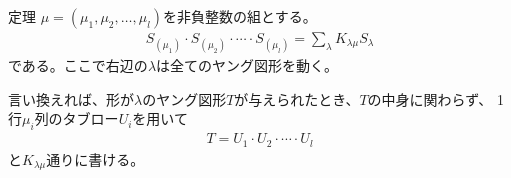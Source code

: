 \documentclass[a4paper,11pt]{jsarticle}
\theoremstyle{plain}
\theoremstyle{definition}
\renewcommand{\(}{\left(}
\renewcommand{\)}{\right)}
\renewcommand{\[}{\left[}
\renewcommand{\]}{\right]}
\renewcommand{\{}{\left\lbrace}
\renewcommand{\}}{\right\rbrace}
\begin{document}
\begin{itembox}[l]{定理}
    $\mu = (\mu_1, \mu_2, \ldots, \mu_l)$を非負整数の組とする。
    \begin{align*}
        S_{(\mu_1)} \cdot S_{(\mu_2)} \cdot\cdots \cdot S_{(\mu_l)} = \sum_{\lambda} K_{\lambda \mu} S_{\lambda}
    \end{align*}
    である。ここで右辺の$\lambda$は全てのヤング図形を動く。

    言い換えれば、形が$\lambda$のヤング図形$T$が与えられたとき、$T$の中身に関わらず、
    1行$\mu_i$列のタブロー$U_i$を用いて
    \begin{align*}
        T = U_1 \cdot U_2 \cdot \cdots \cdot U_l
    \end{align*}
    と$K_{\lambda \mu}$通りに書ける。
\end{itembox}
\end{document}
